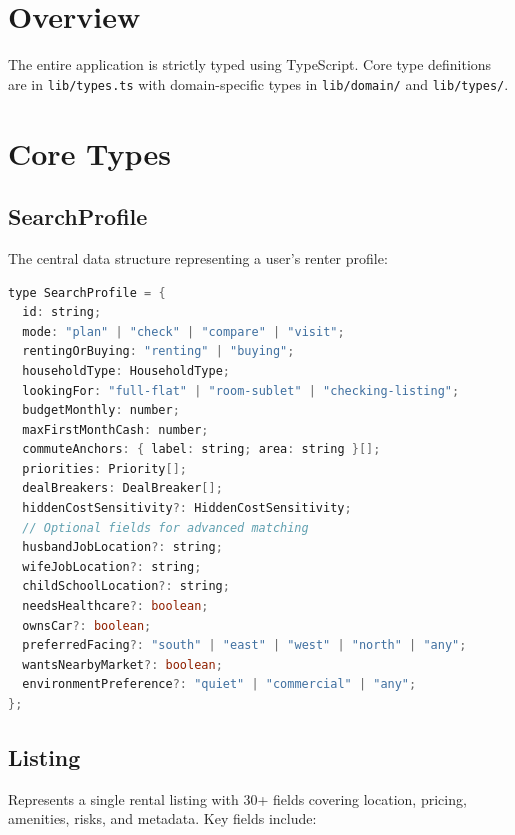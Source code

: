 \documentclass[12pt, a4paper, oneside]{report}
\newcommand{\filepath}[1]{\texttt{\small\color{codeblue}#1}}
\begin{document}
\section{Overview}

The entire application is strictly typed using TypeScript. Core type definitions are in \filepath{lib/types.ts} with domain-specific types in \filepath{lib/domain/} and \filepath{lib/types/}.

\section{Core Types}

\subsection{SearchProfile}

The central data structure representing a user's renter profile:

\begin{lstlisting}[language=Java, caption={SearchProfile Type}]
type SearchProfile = {
  id: string;
  mode: "plan" | "check" | "compare" | "visit";
  rentingOrBuying: "renting" | "buying";
  householdType: HouseholdType;
  lookingFor: "full-flat" | "room-sublet" | "checking-listing";
  budgetMonthly: number;
  maxFirstMonthCash: number;
  commuteAnchors: { label: string; area: string }[];
  priorities: Priority[];
  dealBreakers: DealBreaker[];
  hiddenCostSensitivity?: HiddenCostSensitivity;
  // Optional fields for advanced matching
  husbandJobLocation?: string;
  wifeJobLocation?: string;
  childSchoolLocation?: string;
  needsHealthcare?: boolean;
  ownsCar?: boolean;
  preferredFacing?: "south" | "east" | "west" | "north" | "any";
  wantsNearbyMarket?: boolean;
  environmentPreference?: "quiet" | "commercial" | "any";
};
\end{lstlisting}

\subsection{Listing}

Represents a single rental listing with 30+ fields covering location, pricing, amenities, risks, and metadata. Key fields include:
\end{document}
